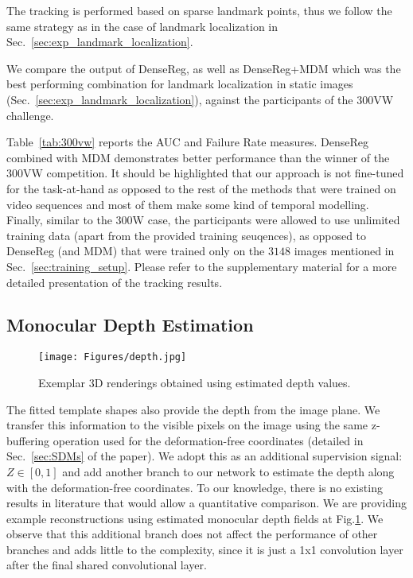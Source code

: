 \documentclass[10pt,twocolumn,letterpaper]{article}
\begin{document}
The tracking is performed based on sparse landmark points, thus we follow the same strategy as in the case of landmark localization in Sec.~\ref{sec:exp_landmark_localization}.

We compare the output of DenseReg, as well as DenseReg+MDM which was the best performing combination for landmark localization in static images (Sec.~\ref{sec:exp_landmark_localization}), against the participants of the 300VW challenge.

Table~\ref{tab:300vw} reports the AUC and Failure Rate measures. DenseReg combined with MDM demonstrates better performance than the winner of the 300VW competition. It should be highlighted that our approach is not fine-tuned for the task-at-hand as opposed to the rest of the methods that were trained on video sequences and most of them make some kind of temporal modelling. Finally, similar to the 300W case, the participants were allowed to use unlimited training data (apart from the provided training seuqences), as opposed to DenseReg (and MDM) that were trained only on the $3148$ images mentioned in Sec.~\ref{sec:training_setup}. 
Please refer to the supplementary material for a more detailed presentation of the tracking results.

\subsection{Monocular Depth Estimation}\label{sec:exp_depth}\begin{figure}[!h]
\centering
\texttt{[image: Figures/depth.jpg]}
\caption{Exemplar 3D renderings obtained using estimated depth values.}
\label{fig:depth}
\vspace{-0.35cm}
\end{figure}The fitted template shapes also provide the depth from the image plane. We transfer this information to the visible pixels on the image using the same z-buffering operation used for the deformation-free coordinates (detailed in Sec.~\ref{sec:SDMs}  of the paper). We adopt this as an additional supervision signal: $Z \in [0,1]$ and add another branch to our network to estimate the depth along with the deformation-free coordinates. To our knowledge, there is no existing results in literature that would allow a quantitative comparison. We are 
providing example reconstructions using estimated monocular depth fields at Fig.\ref{fig:depth}.  We observe that this additional branch does not affect the performance of other branches and adds little to the complexity, since it is just a 1x1 convolution layer after the final shared convolutional layer. 
\end{document}
